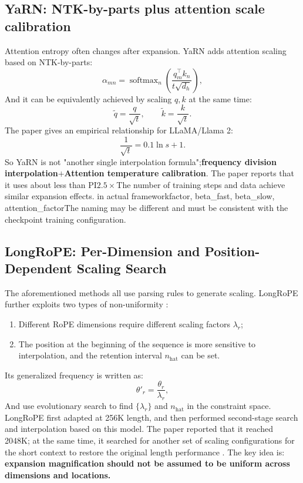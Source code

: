 \documentclass[UTF8,fontset=none,a4paper,10pt]{ctexart}
\newcommand{\term}[1]{\textbf{#1}}
\newcommand{\softmax}{\operatorname{softmax}}
\begin{document}
\subsection{YaRN: NTK-by-parts plus attention scale calibration}

Attention entropy often changes after expansion. YaRN adds attention scaling\cite{en:peng2024yarn} based on NTK-by-parts:
\begin{equation}
  \alpha_{mn}=\softmax_n\!\left(
  \frac{q_m^\top k_n}{t\sqrt{d_h}}
  \right),
  \label{en:eq:yarn-temperature}
\end{equation}
And it can be equivalently achieved by scaling $q,k$ at the same time:
\begin{equation}
  \tilde q=\frac{q}{\sqrt{t}},\qquad
  \tilde k=\frac{k}{\sqrt{t}}.
  \label{en:eq:yarn-qk-scale}
\end{equation}
The paper gives an empirical relationship for LLaMA/Llama 2:
\begin{equation}
  \frac{1}{\sqrt{t}}=0.1\ln s+1.
  \label{en:eq:yarn-fit}
\end{equation}
So YaRN is not "another single interpolation formula";\term{frequency division interpolation$+$Attention temperature calibration}. The paper reports that it uses about less than PI$2.5\times$The number of training steps and data achieve similar expansion effects\cite{en:peng2024yarn}. in actual framework\textnormal{factor}, \textnormal{beta\_fast}, \textnormal{beta\_slow}, \textnormal{attention\_factor}The naming may be different and must be consistent with the checkpoint training configuration.

\subsection{LongRoPE: Per-Dimension and Position-Dependent Scaling Search}

The aforementioned methods all use parsing rules to generate scaling. LongRoPE further exploits two types of non-uniformity \cite{en:ding2024longrope}:
\begin{enumerate}
\item Different RoPE dimensions require different scaling factors $\lambda_r$;
\item The position at the beginning of the sequence is more sensitive to interpolation, and the retention interval $n_{\mathrm{hat}}$ can be set.
\end{enumerate}
Its generalized frequency is written as:
\begin{equation}
  \theta'_r=\frac{\theta_r}{\lambda_r},
  \label{en:eq:longrope-scale}
\end{equation}
And use evolutionary search to find $\{\lambda_r\}$ and $n_{\mathrm{hat}}$ in the constraint space. LongRoPE first adapted at 256K length, and then performed second-stage search and interpolation based on this model. The paper reported that it reached 2048K; at the same time, it searched for another set of scaling configurations for the short context to restore the original length performance \cite{en:ding2024longrope}. The key idea is: \term{ expansion magnification should not be assumed to be uniform across dimensions and locations. }
\end{document}
